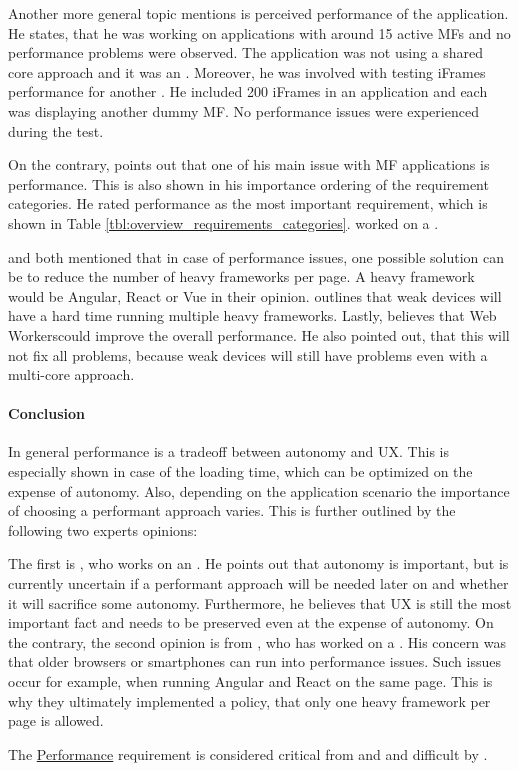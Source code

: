 Another more general topic \textciteSteyer{} mentions is perceived performance of the application.
He states, that he was working on applications with around 15 active \acp{MF} and no performance problems were observed.
The application was not using a shared core approach and it was an .
Moreover, he was involved with testing iFrames performance for another .
He included 200 iFrames in an application and each was displaying another dummy \ac{MF}.
No performance issues were experienced during the test.

On the contrary, \textciteJovanovic{} points out that one of his main issue with \ac{MF} applications is performance.
This is also shown in his importance ordering of the requirement categories.
He rated performance as the most important requirement, which is shown in Table \ref{tbl:overview_requirements_categories}.
\citeauthorJovanovic{} worked on a .

\textciteJovanovic{} and \textcite{Leitner.2020} both mentioned that in case of performance issues, one possible solution can be to reduce the number of heavy frameworks per page.
A heavy framework would be Angular, React or Vue in their opinion.
\citeauthor{Leitner.2020} outlines that weak devices will have a hard time running multiple heavy frameworks.
Lastly, \citeauthorJovanovic{} believes that Web Workers\footnotemark could improve the overall performance.
He also pointed out, that this will not fix all problems, because weak devices will still have problems even with a multi-core approach.



\paragraph{Conclusion}

In general performance is a tradeoff between autonomy and \ac{UX}.
This is especially shown in case of the loading time, which can be optimized on the expense of autonomy.
Also, depending on the application scenario the importance of choosing a performant approach varies.
This is further outlined by the following two experts opinions:

The first is \textciteRehm{}, who works on an .
He points out that autonomy is important, but is currently uncertain if a performant approach will be needed later on and whether it will sacrifice some autonomy.
Furthermore, he believes that \ac{UX} is still the most important fact and needs to be preserved even at the expense of autonomy.
On the contrary, the second opinion is from \textciteJovanovic{}, who has worked on a .
His concern was that older browsers or smartphones can run into performance issues.
Such issues occur for example, when running Angular and React on the same page.
This is why they ultimately implemented a policy, that only one heavy framework per page is allowed.

The \hyperref[cha:requirement_detail_performance]{Performance} requirement is considered critical from \textciteRehm{} and \textciteSteyer{} and difficult by \textciteJovanovic{}.

